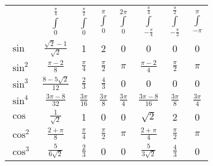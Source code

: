 \renewcommand{\arraystretch}{1.5}
\setlength\tabcolsep{8pt} %
\begin{tabularx}{\linewidth}{@{}lccccccc@{}}
                        & $\int\limits_0^{\frac{\pi}{4}} $ & $\int\limits_0^{\frac{\pi}{2}}$ & $\int\limits_0^{\pi}$ & $\int\limits_0^{2\pi}$ & $\int\limits_{-\frac{\pi}{4}}^{\frac{\pi}{4}} $ & $\int\limits_{-\frac{\pi}{2}}^{\frac{\pi}{2}} $ & $\int\limits_{-\pi}^{\pi}$ \\
    \cmidrule{2-8}
    $\sin$              & $\frac{\sqrt{2}-1}{\sqrt{2}}$    & 1                               & 2                     & 0                      & 0                                               & 0                                               & 0                          \\
    $\sin^2$            & $\frac{\pi-2}{8}$                & $\frac{\pi}{4}$                 & $\frac{\pi}{2}$       & $\pi$                  & $\frac{\pi-2}{4}$                               & $\frac{\pi}{2}$                                 & $\pi$                      \\
    $\sin^3$            & $\frac{8-5\sqrt{2}}{12}$         & $\frac{2}{3}$                   & $\frac{4}{3}$         & 0                      & 0                                               & 0                                               & 0                          \\
    $\sin^4$            & $\frac{3\pi-8}{32}$              & $\frac{3\pi}{16}$               & $\frac{3\pi}{8}$      & $\frac{3\pi}{4}$       & $\frac{3\pi-8}{16}$                             & $\frac{3\pi}{8}$                                & $\frac{3\pi}{4}$           \\
    $\cos$              & $ \frac{1}{\sqrt{2}}$            & 1                               & 0                     & 0                      & $\sqrt{2}$                                      & 2                                               & 0                          \\
    $\cos^2$            & $\frac{2+\pi}{8}$                & $\frac{\pi}{4}$                 & $\frac{\pi}{2}$       & $\pi$                  & $\frac{2+\pi}{4}$                               & $\frac{\pi}{2}$                                 & $\pi$                      \\
    $\cos^3$            & $\frac{5}{6\sqrt{2}}$            & $\frac{2}{3}$                   & 0                     & 0                      & $\frac{5}{3\sqrt{2}}$                           & $\frac{4}{3}$                                   & 0                          \\

\end{tabularx}
